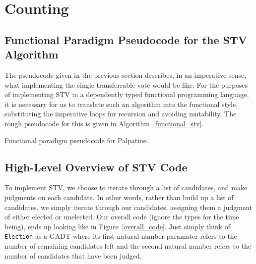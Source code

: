\section{Counting}

\subsection{Functional Paradigm Pseudocode for the STV Algorithm}

The pseudocode given in the previous section describes, in an imperative sense,
what implementing the single transferrable vote would be like. For the purposes
of implementing STV in a dependently typed functional programming language, it
is necessary for us to translate such an algorithm into the functional style,
substituting the imperative loops for recursion and avoiding mutability. The
rough pseudocode for this is given in Algorithm~\ref{functional_stv}.

\begin{algorithm}
    \caption{Functional paradigm pseudocode for Palpatine.}
    \label{functional_stv}
\end{algorithm}

\subsection{High-Level Overview of STV Code} \label{highlevelstv}

To implement STV, we choose to iterate through a list of candidates, and make
judgments on each candidate. In other words, rather than build up a list of
candidates, we simply iterate through our candidates, assigning them a judgment
of either elected or unelected. Our overall code (ignore the types for the time
being), ends up looking like in Figure~\ref{overall_code}. Just simply think of
\texttt{Election} as a GADT where its first natural number paramater refers to
the number of remaining candidates left and the second natural number refers to
the number of candidates that have been judged.

